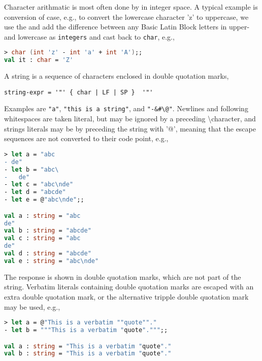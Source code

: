 Character arithmatic is most often done by in integer space. A typical example is conversion of case, e.g., to convert the lowercase character 'z' to uppercase, we use the  and add the difference between any Basic Latin Block letters in upper- and lowercase as \lstinline{integers} and cast back to \lstinline{char}, e.g.,
%
\begin{lstlisting}[language=fsharp,caption={fsharpi, converting case by casting and integer arithmatic.}]
> char (int 'z' - int 'a' + int 'A');; 
val it : char = 'Z'
\end{lstlisting}
%

A string is a sequence of characters enclosed in double quotation marks,
%
 \begin{lstlisting}[language=EBNF]
   string-expr = '"' { char | LF | SP }  '"'
\end{lstlisting}
% 
Examples are \lstinline{"a"}, \lstinline{"this is a string"}, and \lstinline{"-&#\@"}. Newlines and following whitespaces are taken literal, but may be ignored by a preceding \textbackslash character, and strings literals may be  by preceding the string with '@', meaning that the escape sequences are not converted to their code point, e.g., 
%
\begin{lstlisting}[language=fsharp,caption={fsharpi, examples of string literals.}]
> let a = "abc
- de"
- let b = "abc\
-   de"
- let c = "abc\nde"
- let d = "abcde"
- let e = @"abc\nde";;

val a : string = "abc
de"
val b : string = "abcde"
val c : string = "abc
de"
val d : string = "abcde"
val e : string = "abc\nde"
\end{lstlisting}
%
The response is shown in double quotation marks, which are not part of the string. Verbatim literals containing double quotation marks are escaped with an extra double quotation mark, or the alternative tripple double quotation mark may be used, e.g.,
%
\begin{lstlisting}[language=fsharp,caption={fsharpi, example of double quotation marks in verbatim string literals.}]
> let a = @"This is a verbatim ""quote""."   
- let b = """This is a verbatim "quote".""";;

val a : string = "This is a verbatim "quote"."
val b : string = "This is a verbatim "quote"."
\end{lstlisting}
%

